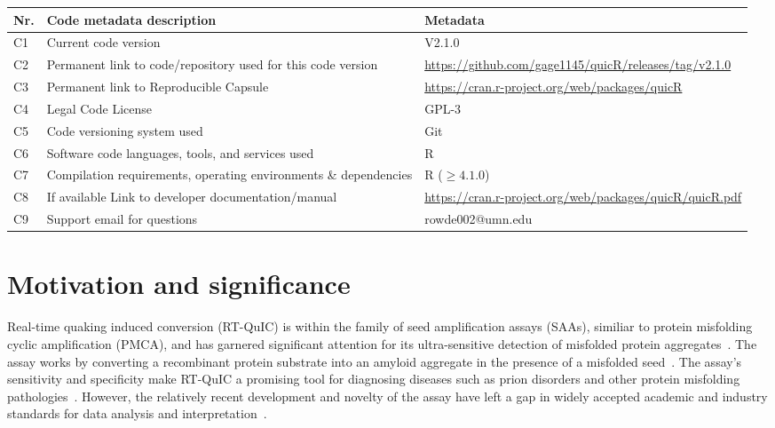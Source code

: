 \documentclass[preprint,12pt,a4paper]{elsarticle}
\begin{document}
    \begin{table}[ht]
        \fontsize{9pt}{9pt}\selectfont
        \centering
        \begin{tabular}{lp{6cm}p{6cm}}
            \hline
            \textbf{Nr.} & \textbf{Code metadata description} & \textbf{Metadata} \\
            \hline
            C1 & Current code version & V2.1.0 \\
            C2 & Permanent link to code/repository used for this code version & \url{https://github.com/gage1145/quicR/releases/tag/v2.1.0} \\
            C3  & Permanent link to Reproducible Capsule & \url{https://cran.r-project.org/web/packages/quicR}\\
            C4 & Legal Code License & GPL-3\\
            C5 & Code versioning system used & Git\\
            C6 & Software code languages, tools, and services used & R\\
            C7 & Compilation requirements, operating environments \& dependencies & R ($\geq{4.1.0}$)\\
            C8 & If available Link to developer documentation/manual & \url{https://cran.r-project.org/web/packages/quicR/quicR.pdf}\\
            C9 & Support email for questions & rowde002@umn.edu\\
            \hline
        \end{tabular}
    \end{table}

    \section{Motivation and significance}
        Real-time quaking induced conversion (RT-QuIC) is within the family of seed amplification assays (SAAs), similiar to protein misfolding cyclic amplification (PMCA), and has garnered significant attention for its ultra-sensitive detection of misfolded protein aggregates~\cite{Wilham2010, Atarashi2011}. The assay works by converting a recombinant protein substrate into an amyloid aggregate in the presence of a misfolded seed~\cite{Wilham2010, Orru2012, Orru2017, Orru2015, Bongianni2019, Dassanayake2016, Hwang2018, Groveman2018, Metrick2020}. The assay's sensitivity and specificity make RT-QuIC a promising tool for diagnosing diseases such as prion disorders and other protein misfolding pathologies~\cite{Fiorini2020, Franceschini2017, Picasso-Risso2022, Holz2021}. However, the relatively recent development and novelty of the assay have left a gap in widely accepted academic and industry standards for data analysis and interpretation~\cite{Rowden2023}.
\end{document}

